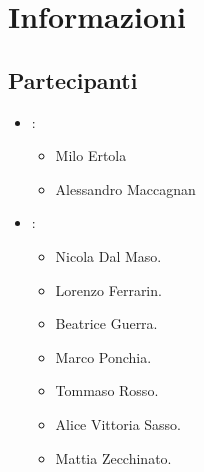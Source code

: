 \section{Informazioni}
\subsection{Partecipanti}

\begin{itemize}
	\item \Proponente:
	\begin{itemize}
		\item Milo Ertola
		\item Alessandro Maccagnan 
	\end{itemize}
	\item \GroupName:
	\begin{itemize}
		\item Nicola Dal Maso.
		\item Lorenzo Ferrarin.
		\item Beatrice Guerra.
		\item Marco Ponchia.
		\item Tommaso Rosso.
		\item Alice Vittoria Sasso.
		\item Mattia Zecchinato.
	\end{itemize}
\end{itemize}

\clearpage


